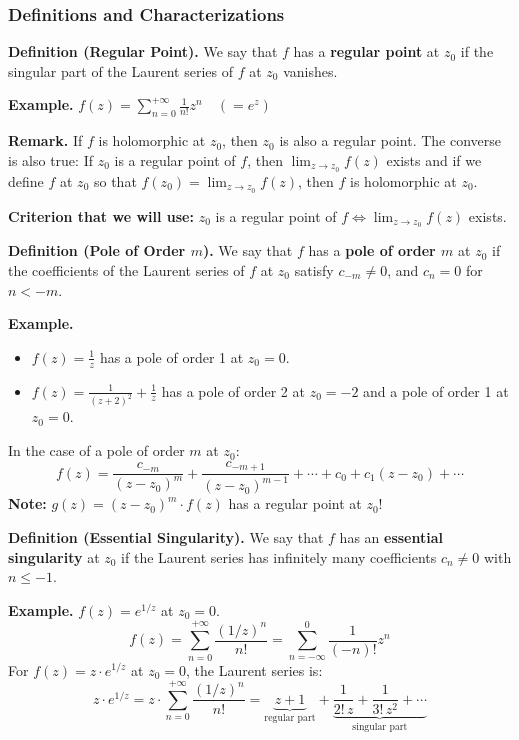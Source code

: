 \subsubsection{Definitions and Characterizations}

\noindent\textbf{Definition (Regular Point).} We say that $f$ has a \textbf{regular point} at $z_0$ if the singular part of the Laurent series of $f$ at $z_0$ vanishes.

\nopagebreak
\medskip
\noindent\textbf{Example.} $f(z) = \sum_{n=0}^{+\infty} \frac{1}{n!} z^n \quad (= e^z)$

\medskip
\noindent\textbf{Remark.} If $f$ is holomorphic at $z_0$, then $z_0$ is also a regular point. The converse is also true: If $z_0$ is a regular point of $f$, then $\lim_{z \to z_0} f(z)$ exists and if we define $f$ at $z_0$ so that $f(z_0) = \lim_{z \to z_0} f(z)$, then $f$ is holomorphic at $z_0$.

\noindent\textbf{Criterion that we will use:} $z_0$ is a regular point of $f \iff \lim_{z \to z_0} f(z)$ exists.

\pagebreak
\noindent\textbf{Definition (Pole of Order $m$).} We say that $f$ has a \textbf{pole of order $m$} at $z_0$ if the coefficients of the Laurent series of $f$ at $z_0$ satisfy $c_{-m} \ne 0$, and $c_n = 0$ for $n < -m$.

\medskip
\noindent\textbf{Example.}
\begin{itemize}
    \item $f(z) = \frac{1}{z}$ has a pole of order 1 at $z_0 = 0$.
    \item $f(z) = \frac{1}{(z+2)^2} + \frac{1}{z}$ has a pole of order 2 at $z_0 = -2$ and a pole of order 1 at $z_0 = 0$.
\end{itemize}

In the case of a pole of order $m$ at $z_0$:
\[
    f(z) = \frac{c_{-m}}{(z-z_0)^m} + \frac{c_{-m+1}}{(z-z_0)^{m-1}} + \cdots + c_0 + c_1(z-z_0) + \cdots
\]
\textbf{Note:} $g(z) = (z-z_0)^m \cdot f(z)$ has a regular point at $z_0$!

\medskip
\noindent\textbf{Definition (Essential Singularity).} We say that $f$ has an \textbf{essential singularity} at $z_0$ if the Laurent series has infinitely many coefficients $c_n \ne 0$ with $n \le -1$.

\medskip
\noindent\textbf{Example.} $f(z) = e^{1/z}$ at $z_0 = 0$.
\[
    f(z) = \sum_{n=0}^{+\infty} \frac{(1/z)^n}{n!} = \sum_{n=-\infty}^{0} \frac{1}{(-n)!} z^n
\]
For $f(z) = z \cdot e^{1/z}$ at $z_0 = 0$, the Laurent series is:
\[
    z \cdot e^{1/z} = z \cdot \sum_{n=0}^{+\infty} \frac{(1/z)^n}{n!} = \underbrace{z + 1}_{\text{regular part}} + \underbrace{\frac{1}{2! \, z} + \frac{1}{3! \, z^2} + \cdots}_{\text{singular part}}
\]

